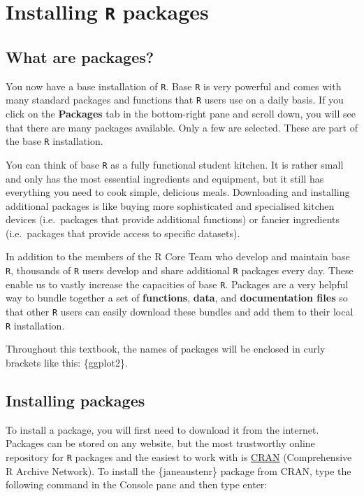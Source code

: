 \documentclass[
  letterpaper,
  DIV=11,
  numbers=noendperiod]{scrreprt}
\begin{document}
\section{\texorpdfstring{Installing \texttt{R}
packages}{Installing R packages}}\label{installing-r-packages}

\subsection{What are packages?}\label{what-are-packages}

You now have a base installation of \texttt{R}. Base \texttt{R} is very
powerful and comes with many standard packages and functions that
\texttt{R} users use on a daily basis. If you click on the
\textbf{Packages} tab in the bottom-right pane and scroll down, you will
see that there are many packages available. Only a few are selected.
These are part of the base \texttt{R} installation.

You can think of base \texttt{R} as a fully functional student kitchen.
It is rather small and only has the most essential ingredients and
equipment, but it still has everything you need to cook simple,
delicious meals. Downloading and installing additional packages is like
buying more sophisticated and specialised kitchen devices (i.e.~packages
that provide additional functions) or fancier ingredients (i.e.~packages
that provide access to specific datasets).

In addition to the members of the R Core Team who develop and maintain
base \texttt{R}, thousands of \texttt{R} users develop and share
additional \texttt{R} packages every day. These enable us to vastly
increase the capacities of base \texttt{R}. Packages are a very helpful
way to bundle together a set of \textbf{functions}, \textbf{data}, and
\textbf{documentation files} so that other \texttt{R} users can easily
download these bundles and add them to their local \texttt{R}
installation.

Throughout this textbook, the names of packages will be enclosed in
curly brackets like this: \{ggplot2\}.

\subsection{Installing packages}\label{sec-InstallPackages}

To install a package, you will first need to download it from the
internet. Packages can be stored on any website, but the most
trustworthy online repository for \texttt{R} packages and the easiest to
work with is \href{https://cran.rstudio.com/index.html}{CRAN}
(Comprehensive R Archive Network). To install the \{janeaustenr\}
package from CRAN, type the following command in the Console pane and
then type enter:
\end{document}
